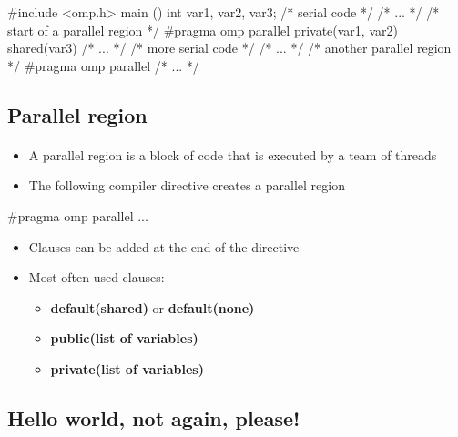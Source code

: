 \documentclass[%
oneside,                 %
final,                   %
10pt]{article}
\begin{document}
\bcppcod
#include <omp.h>
main ()
{
int var1, var2, var3;
/* serial code */
/* ... */
/* start of a parallel region */
#pragma omp parallel private(var1, var2) shared(var3)
{
/* ... */
}
/* more serial code */
/* ... */
/* another parallel region */
#pragma omp parallel
{
/* ... */
}
}

\ecppcod



\subsection{Parallel region}

\paragraph{}
\begin{itemize}
\item A parallel region is a block of code that is executed by a team of threads

\item The following compiler directive creates a parallel region
\end{itemize}

\noindent


\bcppcod
#pragma omp parallel { ... }

\ecppcod

\begin{itemize}
\item Clauses can be added at the end of the directive

\item Most often used clauses:
\begin{itemize}

 \item \textbf{default(shared)} or \textbf{default(none)}

 \item \textbf{public(list of variables)}

 \item \textbf{private(list of variables)}
\end{itemize}

\noindent
\end{itemize}

\noindent



\subsection{Hello world, not again, please!}
\end{document}
